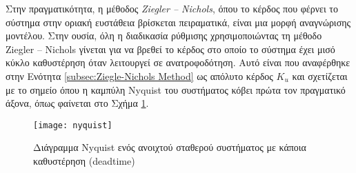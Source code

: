 Στην πραγματικότητα, η μέθοδος \emph{Ziegler -- Nichols}, όπου το κέρδος που φέρνει το σύστημα στην οριακή ευστάθεια βρίσκεται πειραματικά, είναι μια μορφή αναγνώρισης μοντέλου.
Στην ουσία, όλη η διαδικασία ρύθμισης χρησιμοποιώντας τη μέθοδο Ziegler -- Nichols γίνεται για να βρεθεί το κέρδος στο οποίο το σύστημα έχει μισό κύκλο καθυστέρηση όταν λειτουργεί σε ανατροφοδότηση. Αυτό είναι που αναφέρθηκε στην Ενότητα \ref{subsec:Ziegle-Nichols Method} ως απόλυτο κέρδος $K_u$ και σχετίζεται με το σημείο όπου η καμπύλη Nyquist του συστήματος κόβει πρώτα τον πραγματικό άξονα, όπως φαίνεται στο Σχήμα \ref{fig:nyquist}.

\begin{figure}[h]
  \centering
  \texttt{[image: nyquist]}
  \caption{Διάγραμμα Nyquist ενός ανοιχτού σταθερού συστήματος με κάποια καθυστέρηση (deadtime)}
  \label{fig:nyquist}
\end{figure}

